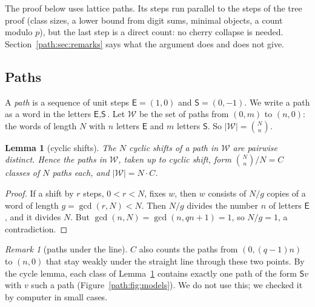 \documentclass[11pt]{article}
\newtheorem{lemma}[theorem]{Lemma}
\theoremstyle{definition}
\theoremstyle{remark}
\newtheorem{remark}[theorem]{Remark}
\numberwithin{equation}{section}
\numberwithin{figure}{section}
\newcommand{\E}{\textsf{E}}
\newcommand{\Ss}{\textsf{S}}
\newcommand{\W}{\mathcal{W}}
\begin{document}
The proof below uses lattice paths. Its steps run parallel to the steps of the tree proof (class sizes, a lower
bound from digit sums, minimal objects, a count modulo $p$), but the last step is a direct count: no cherry
collapse is needed. Section~\ref{path:sec:remarks} says what the argument does and does not give.

\subsection{Paths}

A \emph{path} is a sequence of unit steps $\E=(1,0)$ and $\Ss=(0,-1)$. We write a path as a word in the
letters $\E,\Ss$. Let $\W$ be the set of paths from $(0,m)$ to $(n,0)$: the words of length $N$ with $n$ letters
$\E$ and $m$ letters $\Ss$. So $|\W|=\binom Nn$.

\begin{lemma}[cyclic shifts]\label{path:lem:shift}
The $N$ cyclic shifts of a path in $\W$ are pairwise distinct. Hence the paths in $\W$, taken up to cyclic
shift, form $\binom Nn/N=C$ classes of $N$ paths each, and $|\W|=N\cdot C$.
\end{lemma}
\begin{proof}
If a shift by $r$ steps, $0<r<N$, fixes $w$, then $w$ consists of $N/g$ copies of a word of length $g=\gcd(r,N)<N$.
Then $N/g$ divides the number $n$ of letters $\E$, and it divides $N$. But $\gcd(n,N)=\gcd(n,qn+1)=1$, so
$N/g=1$, a contradiction.
\end{proof}

\begin{remark}[paths under the line]\label{path:rem:dyck}
$C$ also counts the paths from $(0,(q-1)n)$ to $(n,0)$ that stay weakly under the straight line through these two
points. By the cycle lemma, each class of Lemma~\ref{path:lem:shift} contains exactly one path of the form $\Ss v$ with $v$
such a path (Figure~\ref{path:fig:models}). We do not use this; we checked it by computer in small cases.
\end{remark}
\end{document}
